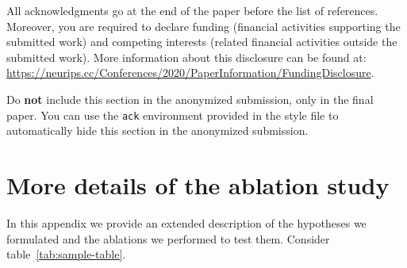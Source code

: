 \documentclass{article}
\newcommand{\attn}[1]{{\color{magenta}{\textbf{#1}}}}
\begin{document}
\begin{ack}
All acknowledgments go at the end of the paper before the list of references. Moreover, you
are required to declare funding (financial activities supporting the submitted work) and
competing interests (related financial activities outside the submitted work).
%
More information about this disclosure can be found at: \url{https://neurips.cc/Conferences/2020/PaperInformation/FundingDisclosure}.

Do {\bf not} include this section in the anonymized submission, only in the final paper.
You can use the \texttt{ack} environment provided in the style file to automatically hide
this section in the anonymized submission.
\end{ack}


\medskip


\begingroup
\makeatletter
\def\begin#1{\csname #1\endcsname}
\def\end#1{\csname end#1\endcsname}

\let\orig@endthebibliography\endthebibliography
\let\endthebibliography\relax
{}

\let\thebibliography\@gobble
\let\endthebibliography\orig@endthebibliography



\makeatother
\endgroup

% 
% 

\appendix
\section{More details of the ablation study} %
\label{app:ablation_details}

In this appendix we provide an extended description of the hypotheses we formulated and 
the ablations we performed to test them. Consider table~\ref{tab:sample-table}.
\end{document}
